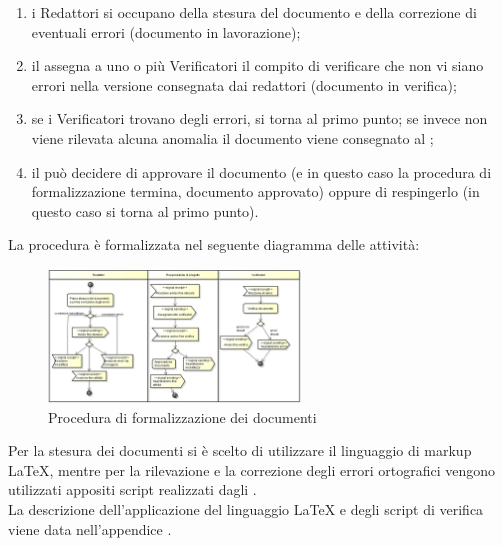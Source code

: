 				\begin{enumerate}
					\item i Redattori si occupano della stesura del documento e della correzione di eventuali errori (documento in lavorazione);
					\item il  assegna a uno o più Verificatori il compito di verificare che non vi siano errori nella versione consegnata dai redattori (documento in verifica);
					\item se i Verificatori trovano degli errori, si torna al primo punto; se invece non viene rilevata alcuna anomalia il documento viene consegnato al ;
					\item il  può decidere di approvare il documento (e in questo caso la procedura di formalizzazione termina, documento approvato) oppure di respingerlo (in questo caso si torna al primo punto).
				\end{enumerate}
				La procedura è formalizzata nel seguente diagramma delle attività:
				\begin{figure}[H]
					\centering
					\includegraphics[width=0.6\textwidth]{NormeDiProgetto/Pics/FormalizzazioneDocumenti}
					\caption{Procedura di formalizzazione dei documenti}
				\end{figure}
		Per la stesura dei documenti si è scelto di utilizzare il linguaggio di markup \LaTeX{}, mentre per la rilevazione e la correzione degli errori ortografici vengono utilizzati appositi script realizzati dagli . \\
		La descrizione dell'applicazione del linguaggio \LaTeX{} e degli script di verifica viene data nell'appendice .
